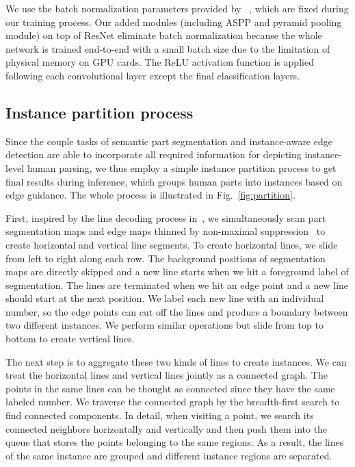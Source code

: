 \documentclass[runningheads]{llncs}
\begin{document}
We use the batch normalization parameters provided by ~\cite{chen2016deeplab}, which are fixed during our training process. Our added modules (including ASPP and pyramid pooling module) on top of ResNet eliminate batch normalization because the whole network is trained end-to-end with a small batch size due to the limitation of physical memory on GPU cards. The ReLU activation function is applied following each convolutional layer except the final classification layers.




\subsection{Instance partition process}

Since the couple tasks of semantic part segmentation and instance-aware edge detection are able to incorporate all required information for depicting instance-level human parsing, we thus employ a simple instance partition process to get final results during inference, which groups human parts into instances based on edge guidance. The whole process is illustrated in Fig.~\ref{fig:partition}.

First, inspired by the line decoding process in~\cite{Liu_2017_ICCV}, we simultaneously scan part segmentation maps and edge maps thinned by non-maximal suppression~\cite{xie2015holistically} to create horizontal and vertical line segments. To create horizontal lines, we slide from left to right along each row. The background positions of segmentation maps are directly skipped and a new line starts when we hit a foreground label of segmentation. The lines are terminated when we hit an edge point and a new line should start at the next position. 
We label each new line with an individual number, so the edge points can cut off the lines and produce a boundary between two different instances. We perform similar operations but slide from top to bottom to create vertical lines.

The next step is to aggregate these two kinds of lines to create instances. We can treat the horizontal lines and vertical lines jointly as a connected graph. The points in the same lines can be thought as connected since they have the same labeled number. We traverse the connected graph by the breadth-first search to find connected components. In detail, when visiting a point, we search its connected neighbors horizontally and vertically and then push them into the queue that stores the points belonging to the same regions. As a result, the lines of the same instance are grouped and different instance regions are separated.
\end{document}
